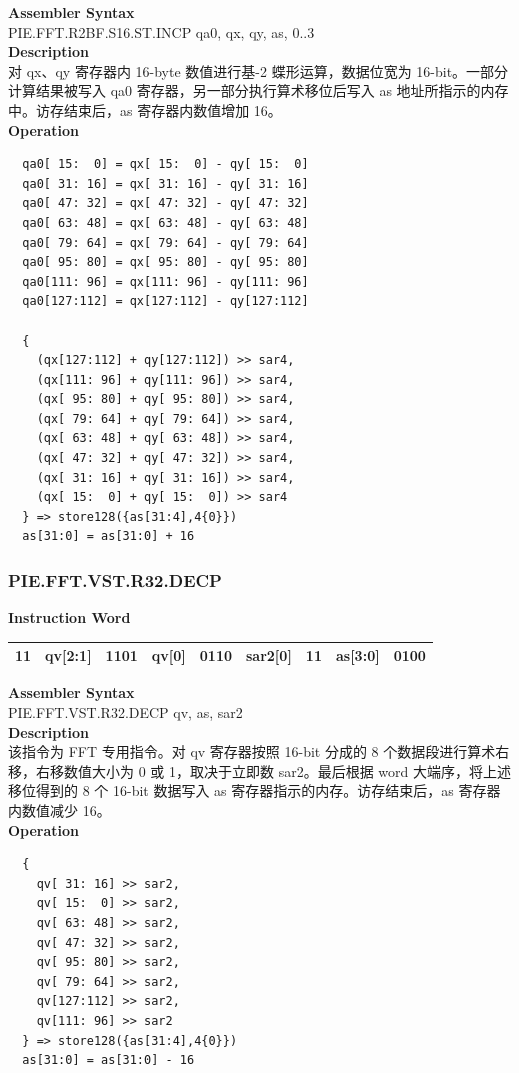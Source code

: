 \textbf{Assembler Syntax} \\
PIE.FFT.R2BF.S16.ST.INCP qa0, qx, qy, as, 0..3 \\
\textbf{Description} \\
对 qx、qy 寄存器内 16-byte 数值进行基-2 蝶形运算，数据位宽为 16-bit。一部分计算结果被写入 qa0 寄存器，另一部分执行算术移位后写入 as 地址所指示的内存中。访存结束后，as 寄存器内数值增加 16。\\
\textbf{Operation}
\begin{lstlisting}
  qa0[ 15:  0] = qx[ 15:  0] - qy[ 15:  0]
  qa0[ 31: 16] = qx[ 31: 16] - qy[ 31: 16]
  qa0[ 47: 32] = qx[ 47: 32] - qy[ 47: 32]
  qa0[ 63: 48] = qx[ 63: 48] - qy[ 63: 48]
  qa0[ 79: 64] = qx[ 79: 64] - qy[ 79: 64]
  qa0[ 95: 80] = qx[ 95: 80] - qy[ 95: 80]
  qa0[111: 96] = qx[111: 96] - qy[111: 96]
  qa0[127:112] = qx[127:112] - qy[127:112]

  {
    (qx[127:112] + qy[127:112]) >> sar4,
    (qx[111: 96] + qy[111: 96]) >> sar4,
    (qx[ 95: 80] + qy[ 95: 80]) >> sar4,
    (qx[ 79: 64] + qy[ 79: 64]) >> sar4,
    (qx[ 63: 48] + qy[ 63: 48]) >> sar4,
    (qx[ 47: 32] + qy[ 47: 32]) >> sar4,
    (qx[ 31: 16] + qy[ 31: 16]) >> sar4,
    (qx[ 15:  0] + qy[ 15:  0]) >> sar4
  } => store128({as[31:4],4{0}})
  as[31:0] = as[31:0] + 16
\end{lstlisting}

\newpage
\subsubsection{PIE.FFT.VST.R32.DECP}\label{instruction:PIEFFTVSTR32DECP}
\setlength\tabcolsep{6pt}
\textbf{Instruction Word} \\
\begin{tabular}{|c|c|c|c|c|c|c|c|c|}
	\hline
	11 & qv[2:1] & 1101 & qv[0] & 0110 & sar2[0] & 11 & as[3:0] & 0100 \\
	\hline
\end{tabular}

\textbf{Assembler Syntax} \\
PIE.FFT.VST.R32.DECP qv, as, sar2 \\
\textbf{Description} \\
该指令为 FFT 专用指令。对 qv 寄存器按照 16-bit 分成的 8 个数据段进行算术右移，右移数值大小为 0 或 1，取决于立即数 sar2。最后根据 word 大端序，将上述移位得到的 8 个 16-bit 数据写入 as 寄存器指示的内存。访存结束后，as 寄存器内数值减少 16。\\
\textbf{Operation}
\begin{lstlisting}
  {
    qv[ 31: 16] >> sar2,
    qv[ 15:  0] >> sar2,
    qv[ 63: 48] >> sar2,
    qv[ 47: 32] >> sar2,
    qv[ 95: 80] >> sar2,
    qv[ 79: 64] >> sar2,
    qv[127:112] >> sar2,
    qv[111: 96] >> sar2
  } => store128({as[31:4],4{0}})
  as[31:0] = as[31:0] - 16
\end{lstlisting}

